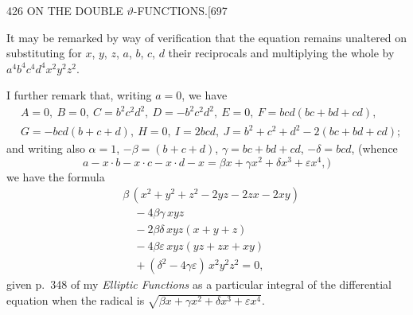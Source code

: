 \documentclass[11pt]{article}
\begin{document}
\clearpage
\begin{center}\small 426 \hfill ON THE DOUBLE $\vartheta$-FUNCTIONS.\hfill [697\end{center}

It may be remarked by way of verification that the equation remains unaltered on substituting for $x$, $y$, $z$, $a$, $b$, $c$, $d$ their reciprocals and multiplying the whole by $a^{4}b^{4}c^{4}d^{4}x^{2}y^{2}z^{2}$.

I further remark that, writing $a = 0$, we have
\begin{align*}
&A = 0,\ B = 0,\ C = b^{2}c^{2}d^{2},\ D = -b^{2}c^{2}d^{2},\ E = 0,\ F = bcd(bc + bd + cd),\\
&G = -bcd(b + c + d),\ H = 0,\ I = 2bcd,\ J = b^{2} + c^{2} + d^{2} - 2(bc + bd + cd);
\end{align*}
and writing also $\alpha = 1$, $-\beta = (b + c + d)$, $\gamma = bc + bd + cd$, $-\delta = bcd$, (whence
\[ a-x \cdot b-x \cdot c-x \cdot d-x = \beta x + \gamma x^{2} + \delta x^{3} + \varepsilon x^{4},) \]
we have the formula
\begin{align*}
&\beta\,(x^{2} + y^{2} + z^{2} - 2yz - 2zx - 2xy)\\
&\quad - 4\beta\gamma\,xyz\\
&\quad - 2\beta\delta\,xyz(x + y + z)\\
&\quad - 4\beta\varepsilon\,xyz(yz + zx + xy)\\
&\quad + (\delta^{2} - 4\gamma\varepsilon)\,x^{2}y^{2}z^{2} = 0,
\end{align*}
given p.~348 of my \textit{Elliptic Functions} as a particular integral of the differential equation when the radical is $\sqrt{\beta x + \gamma x^{2} + \delta x^{3} + \varepsilon x^{4}}$.
\end{document}
